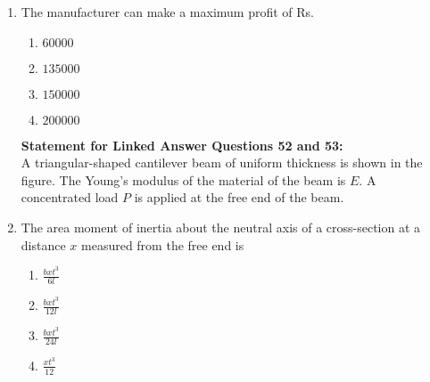 \documentclass[journal,12pt,twocolumn]{IEEEtran}
\theoremstyle{remark}
\begin{document}
\begin{enumerate}[start=40]
    \item The manufacturer can make a maximum profit of Rs.
    \begin{enumerate}
        \item $60000$
        \item $135000$
        \item $150000$
        \item $200000$
    \end{enumerate}



\textbf{Statement for Linked Answer Questions 52 and 53:} \\
A triangular-shaped cantilever beam of uniform thickness is shown in the figure. The Young's modulus of the material of the beam is $E$. A concentrated load $P$ is applied at the free end of the beam.


    \item The area moment of inertia about the neutral axis of a cross-section at a distance $x$ measured from the free end is
    \begin{enumerate}
        \item $\frac{b x t^3}{6l}$
        \item $\frac{b x t^3}{12l}$
        \item $\frac{b x t^3}{24l}$
        \item $\frac{ x t^3}{12}$
    \end{enumerate}

    

    




    


\end{enumerate}
\end{document}
